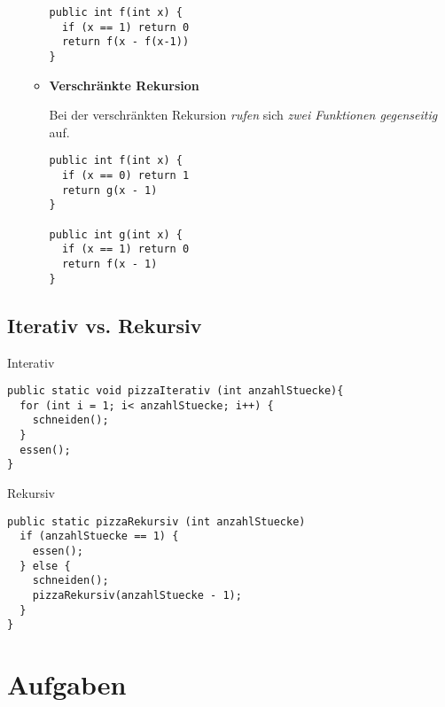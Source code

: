 \documentclass{lehramt-informatik}
\begin{document}
\begin{itemize}
\begin{itemize}
\begin{verbatim}
public int f(int x) {
  if (x == 1) return 0
  return f(x - f(x-1))
}
\end{verbatim}

%

\item \textbf{Verschränkte Rekursion}

Bei der verschränkten Rekursion \emph{rufen} sich \emph{zwei Funktionen
gegenseitig} auf.

\begin{verbatim}
public int f(int x) {
  if (x == 0) return 1
  return g(x - 1)
}

public int g(int x) {
  if (x == 1) return 0
  return f(x - 1)
}
\end{verbatim}
\end{itemize}
\end{itemize}

%

\section{Iterativ vs. Rekursiv}

\cite[Seite 16-19 (Gedruckte Seitenzahlen stimmen nicht)]{aud:fs:1}

Interativ

\begin{verbatim}
public static void pizzaIterativ (int anzahlStuecke){
  for (int i = 1; i< anzahlStuecke; i++) {
    schneiden();
  }
  essen();
}
\end{verbatim}

Rekursiv

\begin{verbatim}
public static pizzaRekursiv (int anzahlStuecke)
  if (anzahlStuecke == 1) {
    essen();
  } else {
    schneiden();
    pizzaRekursiv(anzahlStuecke - 1);
  }
}
\end{verbatim}




\chapter{Aufgaben}
\end{document}
